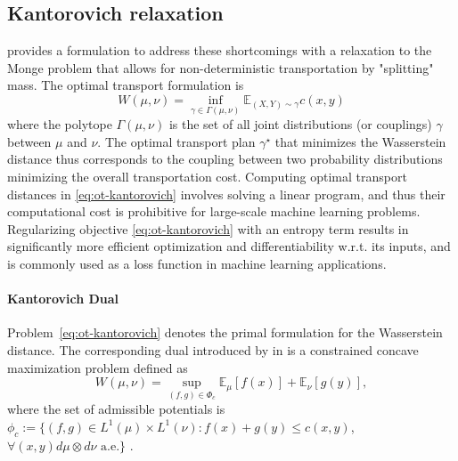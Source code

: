 \subsection{Kantorovich relaxation}  %
\citeauthor{kantorovich1942transfer} provides a formulation to address these shortcomings with a relaxation to the
Monge problem that allows for non-deterministic transportation by "splitting" mass.
The \citet{kantorovich1942transfer} optimal transport formulation is 
\begin{equation}\label{eq:ot-kantorovich}
W(\mu, \nu)= \inf _{\gamma \in \Gamma(\mu, \nu)} \mathbb{E}_{(X, Y) \sim \gamma}c(x, y)
\end{equation}
where the polytope $\Gamma(\mu, \nu)$ is the set of all joint distributions (or couplings) $\gamma$ between $\mu$ and $\nu$.
The optimal transport plan $\gamma^\star$ that minimizes the Wasserstein distance thus corresponds to the coupling between two probability distributions minimizing the overall transportation cost.
Computing optimal transport distances in \eqref{eq:ot-kantorovich} involves solving a linear program,
and thus their computational cost is prohibitive for large-scale machine learning problems.
Regularizing objective \eqref{eq:ot-kantorovich} with an entropy term results in significantly more efficient optimization
\citep{cuturi2013sinkhorn} and differentiability w.r.t. its inputs, and is commonly used as a loss function in machine learning applications.


\paragraph{Kantorovich Dual}
Problem~\eqref{eq:ot-kantorovich} denotes the primal formulation for the Wasserstein distance. The corresponding dual introduced by \citeauthor{kantorovich1942transfer} in \citeyear{kantorovich1942transfer} is a constrained concave maximization problem defined as
\begin{equation} \label{eq:ot-dual}
    W(\mu, \nu)=\sup _{(f, g) \in \Phi_{c}} \mathbb{E}_{\mu}[f(x)]+\mathbb{E}_{\nu}[g(y)],
\end{equation}
where the set of admissible potentials is $\phi_c := \{(f, g) \in L^{1}(\mu) \times L^{1}(\nu): f(x)+g(y) \leq c(x, y)$, $\forall(x, y) d\mu \otimes d\nu \text{ a.e.}\}$ \citep[Theorem 1.3]{villani2021topics}.

